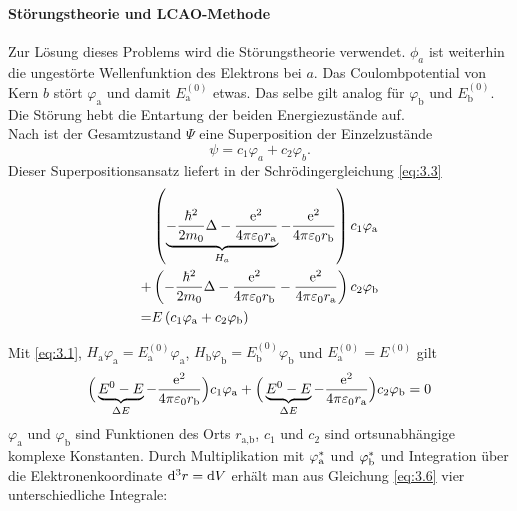     \paragraph{Störungstheorie und LCAO-Methode}
    Zur Lösung dieses Problems wird die {Störungstheorie} verwendet. 
    $\phi_a$ ist weiterhin die ungestörte Wellenfunktion des Elektrons bei $a$.
    Das Coulombpotential von Kern $b$ stört $ \varphi_\text{a} $ und damit $E_\text{a}^{(0)}$ etwas. 
    Das selbe gilt analog für $ \varphi_\text{b}$ und $E^{(0)}_\text{b}$. 
    Die Störung hebt die Entartung der beiden Energiezustände auf.\\

    Nach  ist der Gesamtzustand $\Psi$ eine Superposition der Einzelzustände
    \begin{equation}
        \label{eq:3.4}
        \psi = c_1 \varphi_{a} + c_2 \varphi_{b}.
    \end{equation}
    Dieser Superpositionsansatz liefert in der Schrödingergleichung \eqref{eq:3.3}
    \begin{equation}
        \label{eq:3.5}
        \begin{aligned}	
        &\left( \underbrace{- \frac{\hbar ^2}{2 m_0} \Delta - \frac{\mathrm{e}^2}{4 \pi \varepsilon_0 r_\text{a}}}_{H_{a}} - \frac{\mathrm{e}^2}{4 \pi \varepsilon_0 r_\text{b}} \right) c_1 \varphi_\text{a} \\ 
            +& \left( - \frac{\hbar ^2}{2 m_0} \Delta - \frac{\mathrm{e}^2}{4\pi \varepsilon_0 r_\text{b}} - \frac{\mathrm{e}^2}{4 \pi \varepsilon_0 r_\text{a}} \right) c_2 \varphi_\text b\\
            =& E \left( c_1 \varphi_\text{a}+ c_2 \varphi_\text{b} \right) 
        \end{aligned}
    \end{equation}

    Mit \eqref{eq:3.1}, $H_\text{a} \varphi_\text{a}= E_\text{a}^{(0)} \varphi_\text{a}$, $H_\text{b} \varphi_\text{b}= E_\text{b}^{(0)} \varphi_\text{b}$ und $E^{(0)}_\text{a} = E^{(0)}$ gilt
    \begin{equation}
        \label{eq:3.6}
        \Big( \underbrace{E^{0} -E}_{ \Delta E} - \frac{\mathrm{e}^2}{4 \pi \varepsilon_0 r_\text{b}}  \Big) c_1 \varphi_\text a + \Big( \underbrace{E^{0} -E}_{ \Delta E} - \frac{\mathrm{e}^2}{4 \pi \varepsilon_0 r_\text{a}} \Big) c_2 \varphi_\text{b} =0
    \end{equation}
    $\varphi_\text{a}$ und $\varphi_\text{b}$ sind Funktionen des Orts $r_\text{a,b}$, $c_1$ und $c_2$ sind ortsunabhängige komplexe Konstanten.
    Durch Multiplikation mit $\varphi^*_\text a$ und $\varphi^*_\text b$ und Integration über die Elektronenkoordinate $\mathrm d^3r = \text dV$ erhält man aus Gleichung \eqref{eq:3.6} vier unterschiedliche Integrale:
    
